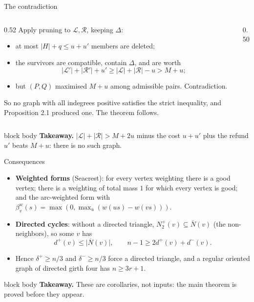 \documentclass[aspectratio=169,11pt]{beamer}
\newcommand{\abs}[1]{\lvert #1\rvert}
\newcommand{\takeaway}[1]{%
  \vfill
  \begin{beamercolorbox}[wd=\dimexpr\textwidth-9pt\relax,sep=4pt,rounded=true]{block body}
    \footnotesize\color{mainblue}\textbf{Takeaway.} \color{black}#1
  \end{beamercolorbox}}
\begin{document}
\begin{frame}{The contradiction}
  \small
  \begin{columns}[T]
  \begin{column}{0.52\textwidth}
    Apply pruning to $\mathcal L,\mathcal R$, keeping $\Delta$:
    \begin{itemize}
      \item at most $\abs H+q\le u+u'$ members are deleted;
      \item the survivors are compatible, contain $\Delta$, and are worth
        \[
          \abs{\mathcal L'}+\abs{\mathcal R'}+u'
          \ge\abs{\mathcal L}+\abs{\mathcal R}-u>M+u ;
        \]
      \item but $(P,Q)$ maximised $M+u$ among admissible pairs. Contradiction.
    \end{itemize}
    \medskip
    So no graph with all indegrees positive satisfies the strict inequality, and
    Proposition 2.1 produced one. The theorem follows.
  \end{column}
  \begin{column}{0.50\textwidth}
    \centering
    \scalebox{0.85}{}
  \end{column}
  \end{columns}
  \takeaway{$\abs{\mathcal L}+\abs{\mathcal R}>M+2u$ minus the cost $u+u'$ plus the refund $u'$
  beats $M+u$: there is no such graph.}
\end{frame}

\begin{frame}{Consequences}
  \small
  \begin{itemize}
    \item \textbf{Weighted forms} (Seacrest): for every vertex weighting there is a good vertex;
      there is a weighting of total mass $1$ for which every vertex is good; and the arc-weighted
      form with $\beta_v^w(s)=\max(0,\max_u(w(us)-w(vs)))$.
    \item \textbf{Directed cycles}: without a directed triangle, $N_2^+(v)\subseteq\overline N(v)$
      (the non-neighbors), so some $v$ has
      \[ d^+(v)\le\abs{\overline N(v)},\qquad n-1\ge 2d^+(v)+d^-(v). \]
    \item Hence $\delta^+\ge n/3$ and $\delta^-\ge n/3$ force a directed triangle, and a regular
      oriented graph of directed girth four has $n\ge3r+1$.
  \end{itemize}
  \takeaway{These are corollaries, not inputs: the main theorem is proved before they appear.}
\end{frame}
\end{document}
